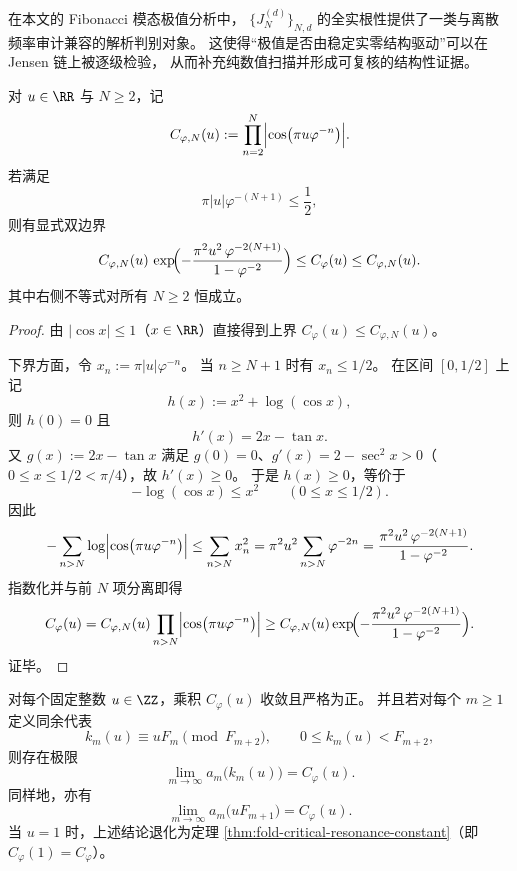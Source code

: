 \begin{remark}[从数值极值到可判别结构的桥接]\label{rem:fold-jensen-bridge-fibonacci-extrema}
在本文的 Fibonacci 模态极值分析中，
\(\{J_N^{(d)}\}_{N,d}\) 的全实根性提供了一类与离散频率审计兼容的解析判别对象。
这使得“极值是否由稳定实零结构驱动”可以在 Jensen 链上被逐级检验，
从而补充纯数值扫描并形成可复核的结构性证据。
\end{remark}

\begin{proposition}[共振梯常数的截断误差上界]\label{prop:fold-resonance-truncation-error}
对 \(u\in\RR\) 与 \(N\ge 2\)，记
\[
C_{\varphi,N}(u):=\prod_{n=2}^{N}\Bigl|\cos\bigl(\pi u\varphi^{-n}\bigr)\Bigr|.
\]
若满足
\[
\pi|u|\varphi^{-(N+1)}\le \frac12,
\]
则有显式双边界
\[
C_{\varphi,N}(u)\,
\exp\!\Bigl(
-\frac{\pi^2u^2\,\varphi^{-2(N+1)}}{1-\varphi^{-2}}
\Bigr)
\le
C_\varphi(u)
\le
C_{\varphi,N}(u).
\]
其中右侧不等式对所有 \(N\ge 2\) 恒成立。
\end{proposition}

\begin{proof}
由 \(|\cos x|\le 1\)（\(x\in\RR\)）直接得到上界
\(
C_\varphi(u)\le C_{\varphi,N}(u)
\)。

下界方面，令 \(x_n:=\pi|u|\varphi^{-n}\)。
当 \(n\ge N+1\) 时有 \(x_n\le 1/2\)。
在区间 \([0,1/2]\) 上记
\[
h(x):=x^2+\log(\cos x),
\]
则 \(h(0)=0\) 且
\[
h'(x)=2x-\tan x.
\]
又 \(g(x):=2x-\tan x\) 满足 \(g(0)=0\)、\(g'(x)=2-\sec^2x>0\)（\(0\le x\le 1/2<\pi/4\)），故 \(h'(x)\ge 0\)。
于是 \(h(x)\ge 0\)，等价于
\[
-\log(\cos x)\le x^2\qquad(0\le x\le 1/2).
\]
因此
\[
-\sum_{n>N}\log\Bigl|\cos\bigl(\pi u\varphi^{-n}\bigr)\Bigr|
\le
\sum_{n>N}x_n^2
=
\pi^2u^2\sum_{n>N}\varphi^{-2n}
=
\frac{\pi^2u^2\,\varphi^{-2(N+1)}}{1-\varphi^{-2}}.
\]
指数化并与前 \(N\) 项分离即得
\[
C_\varphi(u)
=
C_{\varphi,N}(u)\prod_{n>N}\Bigl|\cos\bigl(\pi u\varphi^{-n}\bigr)\Bigr|
\ge
C_{\varphi,N}(u)\exp\!\Bigl(
-\frac{\pi^2u^2\,\varphi^{-2(N+1)}}{1-\varphi^{-2}}
\Bigr).
\]
证毕。
\end{proof}

\begin{theorem}\label{thm:fold-critical-resonance-constant-integer-ladder}
对每个固定整数 \(u\in\ZZ\)，乘积 \(C_\varphi(u)\) 收敛且严格为正。
并且若对每个 \(m\ge 1\) 定义同余代表
\[
k_m(u)\equiv uF_m\pmod{F_{m+2}},
\qquad 0\le k_m(u)<F_{m+2},
\]
则存在极限
\[
\lim_{m\to\infty}a_m\!\bigl(k_m(u)\bigr)=C_\varphi(u).
\]
同样地，亦有
\[
\lim_{m\to\infty}a_m\!\bigl(uF_{m+1}\bigr)=C_\varphi(u).
\]
当 \(u=1\) 时，上述结论退化为定理 \ref{thm:fold-critical-resonance-constant}（即 \(C_\varphi(1)=C_\varphi\)）。
\end{theorem}

